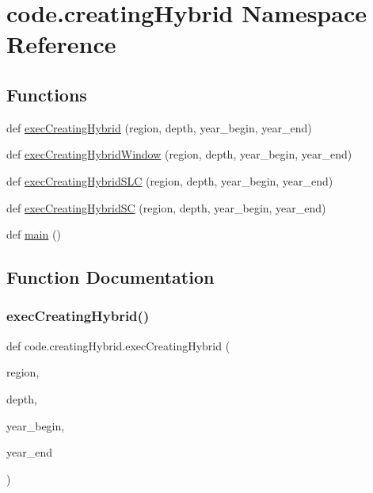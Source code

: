 \hypertarget{namespacecode_1_1creating_hybrid}{}\section{code.\+creating\+Hybrid Namespace Reference}
\label{namespacecode_1_1creating_hybrid}
\subsection*{Functions}
\begin{DoxyCompactItemize}
\item 
def \hyperlink{namespacecode_1_1creating_hybrid_a847b58a67251e0e7c7628d5e24efcc5b}{exec\+Creating\+Hybrid} (region, depth, year\+\_\+begin, year\+\_\+end)
\item 
def \hyperlink{namespacecode_1_1creating_hybrid_ab40ccbe48d926c1d686b7ad14798ddee}{exec\+Creating\+Hybrid\+Window} (region, depth, year\+\_\+begin, year\+\_\+end)
\item 
def \hyperlink{namespacecode_1_1creating_hybrid_a36020850fc092e0a04a292bb5488c719}{exec\+Creating\+Hybrid\+S\+LC} (region, depth, year\+\_\+begin, year\+\_\+end)
\item 
def \hyperlink{namespacecode_1_1creating_hybrid_a385508ee5d2476b9f15e8e2c1daa209a}{exec\+Creating\+Hybrid\+SC} (region, depth, year\+\_\+begin, year\+\_\+end)
\item 
def \hyperlink{namespacecode_1_1creating_hybrid_a727e0bcd9594b737b14900c469ca0318}{main} ()
\end{DoxyCompactItemize}


\subsection{Function Documentation}
\mbox{\label{namespacecode_1_1creating_hybrid_a847b58a67251e0e7c7628d5e24efcc5b}} 
\subsubsection{\texorpdfstring{exec\+Creating\+Hybrid()}{execCreatingHybrid()}}
{\footnotesize\ttfamily def code.\+creating\+Hybrid.\+exec\+Creating\+Hybrid (\begin{DoxyParamCaption}\item[{}]{region,  }\item[{}]{depth,  }\item[{}]{year\+\_\+begin,  }\item[{}]{year\+\_\+end }\end{DoxyParamCaption})}


